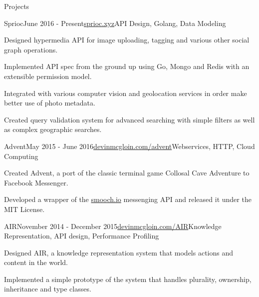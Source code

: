 \documentclass{resume} %
\begin{document}
\begin{rSection}{Projects}


\begin{rSubsection}{Sprioc}{June 2016 - Present}{\href{https://sprioc.xyz}{sprioc.xyz}}{API Design, Golang, Data Modeling}
\item Designed hypermedia API for image uploading, tagging and various other social graph operations.
\item Implemented API spec from the ground up using Go, Mongo and Redis with an extensible permission model.
\item Integrated with various computer vision and geolocation services in order make better use of photo metadata.
\item Created query validation system for advanced searching with simple filters as well as complex geographic searches.
\end{rSubsection}


\begin{rSubsection}{Advent}{May 2015 - June 2016}{\href{https://devinmcgloin.com/advent}{devinmcgloin.com/advent}}{Webservices, HTTP, Cloud Computing}
\item Created Advent, a port of the classic terminal game Collosal Cave Adventure to Facebook Messenger.
\item Developed a wrapper of the \href{https://smooch.io}{smooch.io} messenging API and released it under the MIT License.
\end{rSubsection}


\begin{rSubsection}{AIR}{November 2014 - December 2015}{\href{https://devinmcgloin.com/AIR}{devinmcgloin.com/AIR}}{Knowledge Representation, API design, Performance Profiling}
\item Designed AIR, a knowledge representation system that models actions and content in the world.
\item Implemented a simple prototype of the system that handles plurality, ownership, inheritance and type classes.
\end{rSubsection}
\end{rSection}

\end{document}
